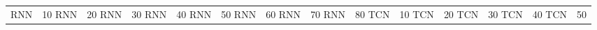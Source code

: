 \begin{table}
\begin{tabular}{|l|c|c|c|c|c|c|c|c|}
RNN & 10%
RNN & 20%
RNN & 30%
RNN & 40%
RNN & 50%
RNN & 60%
RNN & 70%
RNN & 80%
TCN & 10%
TCN & 20%
TCN & 30%
TCN & 40%
TCN & 50%

\end{tabular}
\end{table}
